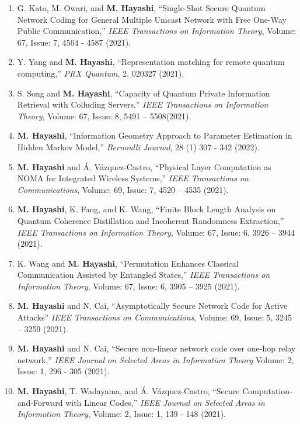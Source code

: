 \documentclass[a4paper,12pt,oneside]{article}
\begin{document}
\begin{enumerate}
\item
G. Kato, M. Owari, and \textbf{M. Hayashi},
``Single-Shot Secure Quantum Network Coding for General Multiple Unicast Network with Free One-Way Public Communication,''
{\em IEEE Transactions on Information Theory}, 
Volume: 67, Issue: 7, 4564 - 4587 (2021).

\item
Y. Yang and \textbf{M. Hayashi},
``Representation matching for remote quantum computing,''
{\em PRX Quantum},
2, 020327 (2021).

\item
S. Song and \textbf{M. Hayashi},
``Capacity of Quantum Private Information Retrieval with Colluding Servers,''
{\em IEEE Transactions on Information Theory}, 
Volume: 67, Issue: 8, 5491 -- 5508(2021).

\item
\textbf{M. Hayashi},
``Information Geometry Approach to Parameter Estimation in Hidden Markov Model,''
{\em Bernoulli Journal},
28 (1) 307 - 342 (2022).

\item
\textbf{M. Hayashi} and \'{A}. V\'{a}zquez-Castro,
``Physical Layer Computation as NOMA for Integrated Wireless Systems,''
{\em IEEE Transactions on Communications},
Volume: 69, Issue: 7, 4520 -- 4535 (2021).

\item
\textbf{M. Hayashi}, K. Fang, and K. Wang,
``Finite Block Length Analysis on Quantum Coherence Distillation and Incoherent Randomness Extraction,''
{\em IEEE Transactions on Information Theory},
Volume: 67, Issue: 6, 3926 -- 3944 (2021).

\item
K. Wang and \textbf{M. Hayashi},
``Permutation Enhances Classical Communication Assisted by Entangled States,''
{\em IEEE Transactions on Information Theory},
Volume: 67, Issue: 6, 3905 -- 3925 (2021).

\item
\textbf{M. Hayashi} and N. Cai,
``Asymptotically Secure Network Code for Active Attacks''
{\em IEEE Transactions on Communications},
Volume: 69, Issue: 5, 3245 -- 3259 (2021).

\item  
\textbf{M. Hayashi} and N. Cai,
``Secure non-linear network code over one-hop relay network,''
{\em IEEE Journal on Selected Areas in Information Theory}
Volume: 2, Issue: 1, 296 - 305 (2021).

\item  
\textbf{M. Hayashi}, T. Wadayama, and \'{A}. V\'{a}zquez-Castro,
``Secure Computation-and-Forward with Linear Codes,''
{\em IEEE Journal on Selected Areas in Information Theory},
Volume: 2, Issue: 1, 139 - 148 (2021).


\end{enumerate}
\end{document}
